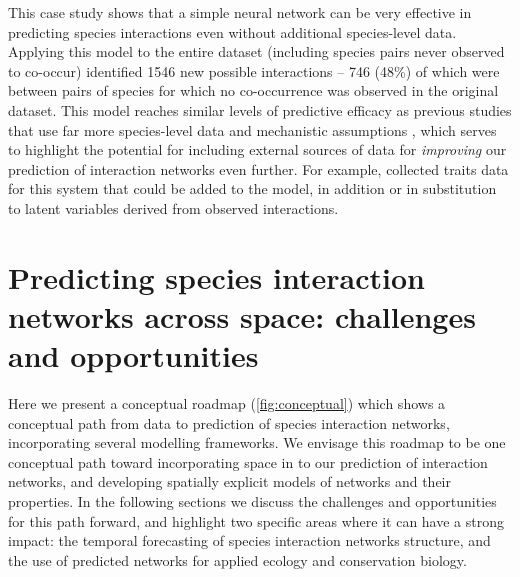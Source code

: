 This case study shows that a simple neural network can be very effective
in predicting species interactions even without additional species-level
data. Applying this model to the entire dataset (including species pairs
never observed to co-occur) identified 1546 new possible interactions --
746 (48\%) of which were between pairs of species for which no
co-occurrence was observed in the original dataset. This model reaches
similar levels of predictive efficacy as previous studies that use far
more species-level data and mechanistic assumptions
\cite{Gravel2013InfFoo}, which serves to highlight the potential for
including external sources of data for \emph{improving} our prediction
of interaction networks even further. For example, \cite{Krasnov2016TraPhy}
collected traits data for this system that could be added to the model,
in addition or in substitution to latent variables derived from observed
interactions.

\section{Predicting species interaction networks across space:
challenges and
opportunities}\label{predicting-species-interaction-networks-across-space-challenges-and-opportunities}

Here we present a conceptual roadmap (\autoref{fig:conceptual}) which shows a
conceptual path from data to prediction of species interaction networks,
incorporating several modelling frameworks. We envisage this roadmap to
be one conceptual path toward incorporating space in to our prediction
of interaction networks, and developing spatially explicit models of
networks and their properties. In the following sections we discuss the
challenges and opportunities for this path forward, and highlight two
specific areas where it can have a strong impact: the temporal
forecasting of species interaction networks structure, and the use of
predicted networks for applied ecology and conservation biology.

